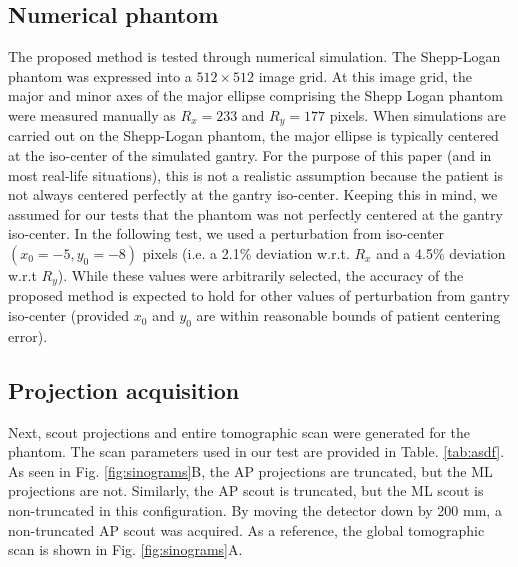 \documentclass[]{spie}
\begin{document}
\subsection{Numerical phantom}
The proposed method is tested through numerical simulation. The Shepp-Logan phantom was expressed into a $512 \times 512$ image grid. At this image grid, the major and minor axes of the major ellipse comprising the Shepp Logan phantom were measured manually as $R_x = 233$ and $R_y = 177$ pixels. When simulations are carried out on the Shepp-Logan phantom, the major ellipse is typically centered at the iso-center of the simulated gantry. For the purpose of this paper (and in most real-life situations), this is not a realistic assumption because the patient is not always centered perfectly at the gantry iso-center. Keeping this in mind, we assumed for our tests that the phantom was not perfectly centered at the gantry iso-center. In the following test, we used a perturbation from iso-center $(x_0 = -5, y_0 = -8)$ pixels (i.e. a 2.1\% deviation w.r.t. $R_x$ and a 4.5\% deviation w.r.t $R_y$). While these values were arbitrarily selected, the accuracy of the proposed method is expected to hold for other values of perturbation from gantry iso-center (provided $x_0$ and $y_0$ are within reasonable bounds of patient centering error). %

\subsection{Projection acquisition}
Next, scout projections and entire tomographic scan were generated for the phantom. The scan parameters used in our test are provided in Table. \ref{tab:asdf}. As seen in Fig. \ref{fig:sinograms}B, the AP projections are truncated, but the ML projections are not. Similarly, the AP scout is truncated, but the ML scout is non-truncated in this configuration. By moving the detector down by 200 mm, a non-truncated AP scout was acquired. As a reference, the global tomographic scan is shown in Fig. \ref{fig:sinograms}A.  
\end{document}
